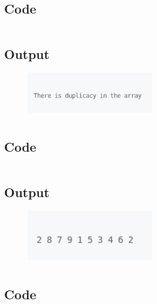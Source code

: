 \documentclass[12pt]{article}
\begin{document}
\subsection{Code}
\inputminted{c}{q2.c}
\subsection{Output}
\begin{figure}[h]
    \centering
    \includegraphics[width=0.5\textwidth]{2.png}
\end{figure}

\newpage
\section{}
\subsection{Code}
\inputminted{c}{q3.c}
\subsection{Output}
\begin{figure}[h]
    \centering
    \includegraphics[width=0.5\textwidth]{3.png}
\end{figure}

\newpage
\section{}
\subsection{Code}
\inputminted{c}{q4.c}
\end{document}
